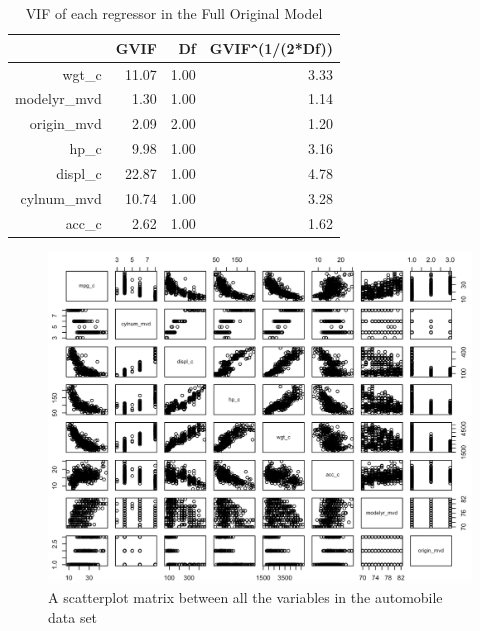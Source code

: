\documentclass{article}
\begin{document}
\begin{table}[ht]
\centering
\begin{tabular}{rrrr}
  \hline
 & GVIF & Df & GVIF\verb|^|(1/(2*Df)) \\ 
  \hline
wgt\_c & 11.07 & 1.00 & 3.33 \\ 
  modelyr\_mvd & 1.30 & 1.00 & 1.14 \\ 
  origin\_mvd & 2.09 & 2.00 & 1.20 \\ 
  hp\_c & 9.98 & 1.00 & 3.16 \\ 
  displ\_c & 22.87 & 1.00 & 4.78 \\ 
  cylnum\_mvd & 10.74 & 1.00 & 3.28 \\ 
  acc\_c & 2.62 & 1.00 & 1.62 \\ 
   \hline
\end{tabular}
\caption{VIF of each regressor in the Full Original Model}
\label{tab:fulloriginalvif}
\end{table}

\clearpage
\newpage 

\begin{figure}
	\centering
	\includegraphics[width=1\linewidth]{1p_ScPlMtr}
	\caption[Scatterplot Matrix of the Original Full Model]
	{A scatterplot matrix between all the variables in the automobile data set}
\end{figure}

\clearpage
\newpage 
\end{document}
